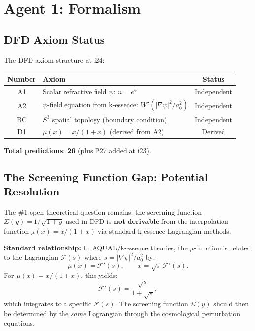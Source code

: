 \documentclass[11pt]{article}
\newcommand{\aM}{a_0}
\begin{document}
\section{Agent 1: Formalism}

\subsection{DFD Axiom Status}

The DFD axiom structure at i24:

\begin{center}
\begin{tabular}{clc}
\toprule
\textbf{Number} & \textbf{Axiom} & \textbf{Status} \\
\midrule
A1 & Scalar refractive field $\psi$: $n = e^\psi$ & Independent \\
A2 & $\psi$-field equation from k-essence: $W'(|\nabla\psi|^2/\aM^2)$ & Independent \\
BC & $S^3$ spatial topology (boundary condition) & Independent \\
D1 & $\mu(x) = x/(1+x)$ (derived from A2) & Derived \\
\bottomrule
\end{tabular}
\end{center}

\textbf{Total predictions: 26} (plus P27 added at i23).

\subsection{The Screening Function Gap: Potential Resolution}

The \#1 open theoretical question remains: the screening function
$\Sigma(y) = 1/\sqrt{1+y}$ used in DFD is \textbf{not derivable}
from the interpolation function $\mu(x) = x/(1+x)$ via standard
k-essence Lagrangian methods.

\textbf{Standard relationship:} In AQUAL/k-essence theories, the
$\mu$-function is related to the Lagrangian $\mathcal{F}(s)$ where
$s = |\nabla\psi|^2/\aM^2$ by:
\begin{equation}
  \mu(x) = \mathcal{F}'(s), \qquad x = \sqrt{s}\,\mathcal{F}'(s).
\end{equation}
For $\mu(x) = x/(1+x)$, this yields:
\begin{equation}
  \mathcal{F}'(s) = \frac{\sqrt{s}}{1 + \sqrt{s}},
\end{equation}
which integrates to a specific $\mathcal{F}(s)$. The screening function
$\Sigma(y)$ should then be determined by the \emph{same} Lagrangian
through the cosmological perturbation equations.
\end{document}
